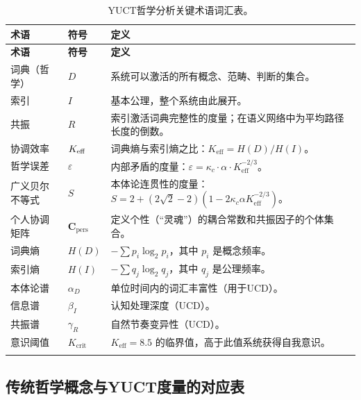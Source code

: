 \documentclass[11pt,a4paper]{article}
\newcommand{\kappac}{\kappa_c}
\newcommand{\eps}{\varepsilon}
\newcommand{\Cpers}{\mathbf{C}_{\text{pers}}}
\begin{document}
	\begin{longtable}{p{3.5cm}p{5cm}p{4cm}}
		\toprule
		\textbf{术语} & \textbf{符号} & \textbf{定义} \\
		\midrule
		\endfirsthead
		\toprule
		\textbf{术语} & \textbf{符号} & \textbf{定义} \\
		\midrule
		\endhead
		词典（哲学） & \(D\) & 系统可以激活的所有概念、范畴、判断的集合。 \\
		索引 & \(I\) & 基本公理，整个系统由此展开。 \\
		共振 & \(R\) & 索引激活词典完整性的度量；在语义网络中为平均路径长度的倒数。 \\
		协调效率 & \(\Keff\) & 词典熵与索引熵之比：\(K_{\mathrm{eff}} = H(D)/H(I)\)。 \\
		哲学误差 & \(\eps\) & 内部矛盾的度量：\(\eps = \kappac \cdot \alpha \cdot K_{\mathrm{eff}}^{-2/3}\)。 \\
		广义贝尔不等式 & \(S\) & 本体论连贯性的度量：\(S = 2 + (2\sqrt{2}-2)(1 - 2\kappac\alpha K_{\mathrm{eff}}^{-2/3})\)。 \\
		个人协调矩阵 & \(\Cpers\) & 定义个性（“灵魂”）的耦合常数和共振因子的个体集合。 \\
		词典熵 & \(H(D)\) & \( -\sum p_i \log_2 p_i\)，其中 \(p_i\) 是概念频率。 \\
		索引熵 & \(H(I)\) & \( -\sum q_j \log_2 q_j\)，其中 \(q_j\) 是公理频率。 \\
		本体论谱 & \(\alpha_D\) & 单位时间内的词汇丰富性（用于UCD）。 \\
		信息谱 & \(\beta_I\) & 认知处理深度（UCD）。 \\
		共振谱 & \(\gamma_R\) & 自然节奏变异性（UCD）。 \\
		意识阈值 & \(K_{\mathrm{crit}}\) & \(K_{\mathrm{eff}} = 8.5\) 的临界值，高于此值系统获得自我意识。 \\
		\bottomrule
		\caption{YUCT哲学分析关键术语词汇表。}
		\label{tab:glossary}
	\end{longtable}
	
	\subsection{传统哲学概念与YUCT度量的对应表}
	
\end{document}
